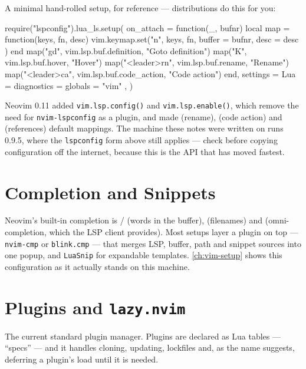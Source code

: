 A minimal hand-rolled setup, for reference --- distributions do this for you:

\begin{luacode}
require("lspconfig").lua_ls.setup({
  on_attach = function(_, bufnr)
    local map = function(keys, fn, desc)
      vim.keymap.set("n", keys, fn, { buffer = bufnr, desc = desc })
    end
    map("gd", vim.lsp.buf.definition, "Goto definition")
    map("K", vim.lsp.buf.hover, "Hover")
    map("<leader>rn", vim.lsp.buf.rename, "Rename")
    map("<leader>ca", vim.lsp.buf.code_action, "Code action")
  end,
  settings = { Lua = { diagnostics = { globals = { "vim" } } } },
})
\end{luacode}

\begin{remark}
	Neovim 0.11 added \texttt{vim.lsp.config()} and \texttt{vim.lsp.enable()},
	which remove the need for \texttt{nvim-lspconfig} as a plugin, and made
	   (rename),    (code action) and
	   (references) default mappings. The machine these notes
	were written on runs 0.9.5, where the \texttt{lspconfig} form above still
	applies --- check  before copying configuration off the internet,
	because this is the API that has moved fastest.
\end{remark}

\section{Completion and Snippets}\label{sec:nvim-cmp}

Neovim's built-in completion is  /  (words in the buffer),
  (filenames) and   (omni-completion,
which the LSP client provides). Most setups layer a plugin on top ---
\texttt{nvim-cmp} or \texttt{blink.cmp} --- that merges LSP, buffer, path and
snippet sources into one popup, and \texttt{LuaSnip} for expandable templates.
\autoref{ch:vim-setup} shows this configuration as it actually stands on this
machine.

\section{Plugins and \texttt{lazy.nvim}}\label{sec:nvim-plugins}

\begin{definition}
	The current standard plugin manager. Plugins are declared as Lua tables ---
	``specs'' --- and it handles cloning, updating, lockfiles and, as the name
	suggests, deferring a plugin's load until it is needed.
\end{definition}

